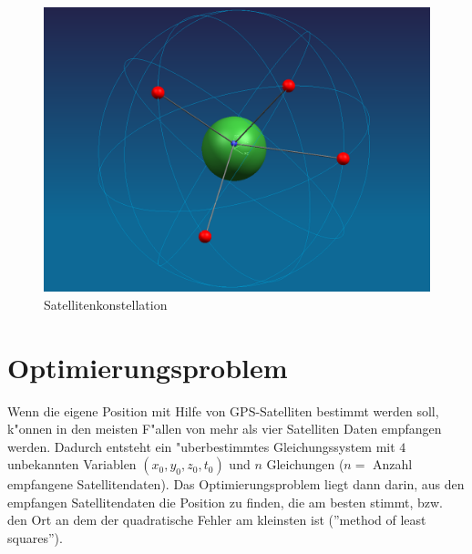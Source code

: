 	\begin{figure}[ht!]\centering
		\includegraphics[scale = 0.3]{gps/gps.png}
		\caption{Satellitenkonstellation}
		\label{fig. satellitenkonstellation}
	\end{figure}

\section{Optimierungsproblem}
	Wenn die eigene Position mit Hilfe von GPS-Satelliten bestimmt werden soll, k"onnen in den meisten F"allen von mehr als vier Satelliten Daten empfangen werden. Dadurch entsteht ein "uberbestimmtes Gleichungssystem mit $4$ unbekannten Variablen $(x_0,y_0,z_0,t_0)$ und $n$ Gleichungen ($n = $ Anzahl empfangene Satellitendaten). Das Optimierungsproblem liegt dann darin, aus den empfangen Satellitendaten die Position zu finden, die am besten stimmt, bzw. den Ort an dem der quadratische Fehler am kleinsten ist (''method of least squares'').

